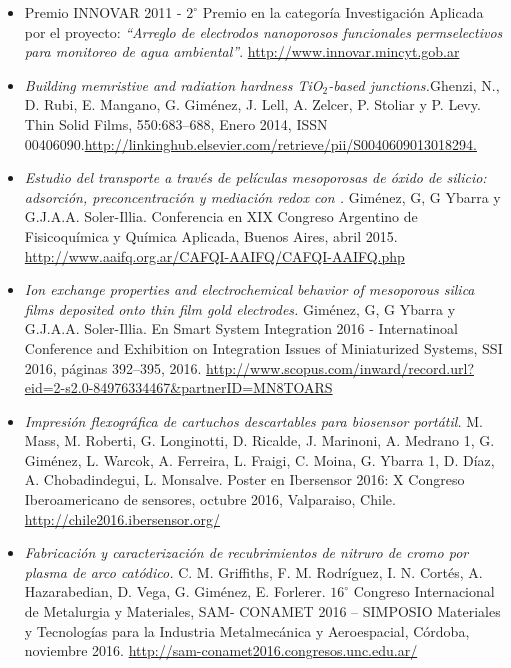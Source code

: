   \begin{itemize}[leftmargin=0cm,label={}]
  	
  	\item Premio INNOVAR 2011 - $2^\circ$ Premio en la categoría Investigación Aplicada por el proyecto: \textit{``Arreglo de electrodos nanoporosos funcionales permselectivos para monitoreo de agua ambiental''}. \url{http://www.innovar.mincyt.gob.ar}
   
    \item \textit{Building memristive and radiation hardness TiO$_2$-based junctions.}\linebreak Ghenzi, N., D. Rubi, E. Mangano, G. Giménez, J. Lell, A. Zelcer, P. Stoliar y P. Levy. Thin Solid Films, 550:683–688, Enero 2014, ISSN 00406090.\url{http://linkinghub.elsevier.com/retrieve/pii/S0040609013018294.}

    \item \textit{Estudio del transporte a través de películas mesoporosas de óxido de silicio: adsorción, preconcentración y mediación redox con \aminorutenioCompleto.} Giménez, G, G Ybarra y G.J.A.A. Soler-Illia. Conferencia en XIX Congreso Argentino de Fisicoquímica y Química Aplicada, Buenos Aires, abril 2015. \url{http://www.aaifq.org.ar/CAFQI-AAIFQ/CAFQI-AAIFQ.php}
    
    \item \textit{Ion exchange properties and electrochemical behavior of mesoporous silica films deposited onto thin film gold electrodes.} Giménez, G, G Ybarra y G.J.A.A. Soler-Illia. En Smart System Integration 2016 - Internatinoal Conference and
    Exhibition on Integration Issues of Miniaturized Systems, SSI 2016, páginas 392–395, 2016. \url{http://www.scopus.com/inward/record.url?eid=2-s2.0-84976334467&partnerID=MN8TOARS}
    
    \item \textit{Impresión flexográfica de cartuchos descartables para biosensor portátil.} M. Mass, M. Roberti, G. Longinotti, D. Ricalde, J. Marinoni, A. Medrano 1, G. Giménez, L. Warcok, A. Ferreira, L. Fraigi, C. Moina, G. Ybarra 1, D. Díaz, A. Chobadindegui, L. Monsalve. Poster en Ibersensor 2016: X Congreso Iberoamericano de sensores, octubre 2016, Valparaiso,  Chile. \url{http://chile2016.ibersensor.org/}
    
    \item \textit{Fabricación y caracterización de recubrimientos de nitruro de cromo por plasma de arco catódico.} C. M. Griffiths, F. M. Rodríguez, I. N. Cortés, A. Hazarabedian, D. Vega, G. Giménez, E. Forlerer. $16^\circ$ Congreso Internacional de Metalurgia y Materiales, SAM-
CONAMET 2016 – SIMPOSIO Materiales y Tecnologías para la Industria Metalmecánica y Aeroespacial, Córdoba, noviembre 2016. \url{http://sam-conamet2016.congresos.unc.edu.ar/}


\end{itemize}
